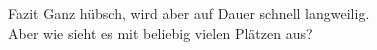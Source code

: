 \begin{frame}{Fazit}
    Ganz hübsch, wird aber auf Dauer schnell langweilig.\\
    Aber wie sieht es mit beliebig vielen Plätzen aus?
\end{frame}
